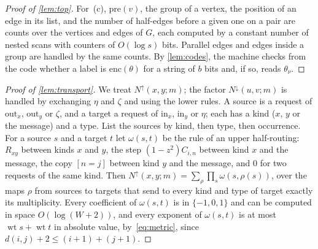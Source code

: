 \documentclass[11pt]{article}
\theoremstyle{definition}
\theoremstyle{definition}
\theoremstyle{remark}
\newcommand{\wt}{\operatorname{wt}}
\newcommand{\out}{\mathrm{out}}
\newcommand{\inn}{\mathrm{in}}
\newcommand{\Nup}{N^{\uparrow}}
\newcommand{\Ndown}{N^{\downarrow}}
\begin{document}
\begin{proof}[Proof of \cref{lem:top}]
For~(c), $\mathrm{pre}(v)$, the group of a vertex, the position of an edge in its list, and the number of half-edges before a given one on a pair are counts over the vertices and edges of $G$, each computed by a constant number of nested scans with counters of $O(\log s)$ bits. Parallel edges and edges inside a group are handled by the same counts. By \cref{lem:codes}, the machine checks from the code whether a label is $\mathrm{enc}(\theta)$ for a string of $b$ bits and, if so, reads $\theta_\nu$.
\end{proof}

\begin{proof}[Proof of \cref{lem:transport}]
We treat $\Nup(x,y;m)$; the factor $\Ndown(u,v;m)$ is handled by exchanging $\eta$ and $\zeta$ and using the lower rules. A source is a request of $\out_x$, $\out_y$ or $\zeta$, and a target a request of $\inn_x$, $\inn_y$ or $\eta$; each has a kind ($x$, $y$ or the message) and a type. List the sources by kind, then type, then occurrence. For a source $s$ and a target $t$ let $\omega(s,t)$ be the rule of an upper half-routing: $R_{xy}$ between kinds $x$ and $y$, the step $(1-z^2)C_{i,n}$ between kind $x$ and the message, the copy $[n=j]$ between kind $y$ and the message, and $0$ for two requests of the same kind. Then $\Nup(x,y;m)=\sum_\rho\prod_s\omega(s,\rho(s))$, over the maps $\rho$ from sources to targets that send to every kind and type of target exactly its multiplicity. Every coefficient of $\omega(s,t)$ is in $\{-1,0,1\}$ and can be computed in space $O(\log(W+2))$, and every exponent of $\omega(s,t)$ is at most $\wt s+\wt t$ in absolute value, by~\eqref{eq:metric}, since $d(i,j)+2\le(i+1)+(j+1)$.


\end{proof}
\end{document}
